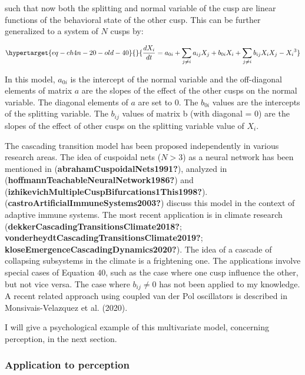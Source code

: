 \documentclass[
  a4paper,
  DIV=11,
  numbers=noendperiod]{scrreprt}
\begin{document}
such that now both the splitting and normal variable of the cusp are
linear functions of the behavioral state of the other cusp. This can be
further generalized to a system of \(N\) cusps by:

\begin{equation}\protect\hypertarget{eq-ch4n-20-old-40}{}{
\frac{dX_{i}}{dt} = a_{0i} + \sum_{j \neq i}^{}{a_{ij}X_{j}} + b_{0i}X_{i} + \sum_{j \neq i}^{}{b_{ij}X_{i}X_{j}} - {X_{i}}^{3}
}\label{eq-ch4n-20-old-40}\end{equation}

In this model, \(a_{0i}\) is the intercept of the normal variable and
the off-diagonal elements of matrix \(a\) are the slopes of the effect
of the other cusps on the normal variable. The diagonal elements of
\(a\) are set to 0. The \(b_{0i}\) values are the intercepts of the
splitting variable. The \(b_{ij}\) values of matrix b (with diagonal =
0) are the slopes of the effect of other cusps on the splitting variable
value of \(X_{i}\).

The cascading transition model has been proposed independently in
various research areas. The idea of cuspoidal nets (\(N>3\)) as a neural
network has been mentioned in (\textbf{abrahamCuspoidalNets1991?}),
analyzed in (\textbf{hoffmannTeachableNeuralNetwork1986?}) and
(\textbf{izhikevichMultipleCuspBifurcations1This1998?}).
(\textbf{castroArtificialImmuneSystems2003?}) discuss this model in the
context of adaptive immune systems. The most recent application is in
climate research (\textbf{dekkerCascadingTransitionsClimate2018?};
\textbf{vonderheydtCascadingTransitionsClimate2019?};
\textbf{kloseEmergenceCascadingDynamics2020?}). The idea of a cascade of
collapsing subsystems in the climate is a frightening one. The
applications involve special cases of Equation \(40\), such as the case
where one cusp influence the other, but not vice versa. The case where
\(b_{ij} \neq 0\) has not been applied to my knowledge. A recent related
approach using coupled van der Pol oscillators is described in
Monsivais-Velazquez et al. (2020).

I will give a psychological example of this multivariate model,
concerning perception, in the next section.

\hypertarget{sec-Application-to-perception}{%
\subsubsection{Application to
perception}\label{sec-Application-to-perception}}
\end{document}

